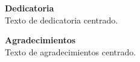 \thispagestyle{empty}




\begin{center}
    \textbf{Dedicatoria}\\
    Texto de dedicatoria centrado.


    \vspace{2cm}


    \textbf{Agradecimientos}\\
    Texto de agradecimientos centrado.
\end{center}
